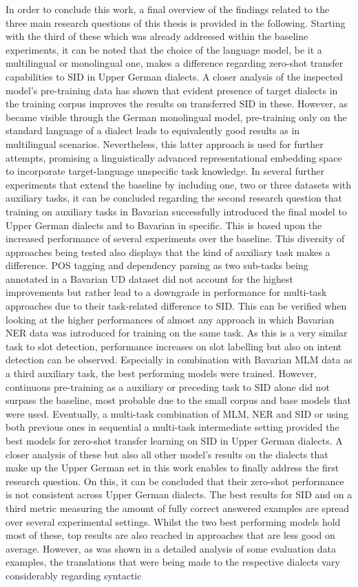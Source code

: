\documentclass[11pt,a4paper,twoside,openright]{scrbook}
\begin{document}
In order to conclude this work, a final overview of the findings related to the three main research questions of this thesis is provided in the following. Starting with the third of these which was already addressed within the baseline experiments, it can be noted that the choice of the language model, be it a multilingual or monolingual one, makes a difference regarding zero-shot transfer capabilities to SID in Upper German dialects. A closer analysis of the inspected model's pre-training data has shown that evident presence of target dialects in the training corpus improves the results on transferred SID in these. However, as became visible through the German monolingual model, pre-training only on the standard language of a dialect leads to equivalently good results as in multilingual scenarios. Nevertheless, this latter approach is used for further attempts, promising a linguistically advanced representational embedding space to incorporate target-language unspecific task knowledge. In several further experiments that extend the baseline by including one, two or three datasets with auxiliary tasks, it can be concluded regarding the second research question that training on auxiliary tasks in Bavarian successfully introduced the final model to Upper German dialects and to Bavarian in specific. This is based upon the increased performance of several experiments over the baseline. This diversity of approaches being tested also displays that the kind of auxiliary task makes a difference. POS tagging and dependency parsing as two sub-tasks being annotated in a Bavarian UD dataset did not account for the highest improvements but rather lead to a downgrade in performance for multi-task approaches due to their task-related difference to SID. This can be verified when looking at the higher performances of almost any approach in which Bavarian NER data was introduced for training on the same task. As this is a very similar task to slot detection, performance increases on slot labelling but also on intent detection can be observed. Especially in combination with Bavarian MLM data as a third auxiliary task, the best performing models were trained. However, continuous pre-training as a auxiliary or preceding task to SID alone did not surpass the baseline, most probable due to the small corpus and base models that were used. Eventually, a multi-task combination of MLM, NER and SID or using both previous ones in sequential a multi-task intermediate setting provided the best models for zero-shot transfer learning on SID in Upper German dialects. A closer analysis of these but also all other model's results on the dialects that make up the Upper German set in this work enables to finally address the first research question. On this, it can be concluded that their zero-shot performance is not consistent across Upper German dialects. The best results for SID and on a third metric measuring the amount of fully correct answered examples are spread over several experimental settings. Whilst the two best performing models hold most of these, top results are also reached in approaches that are less good on average. However, as was shown in a detailed analysis of some evaluation data examples, the translations that were being made to the respective dialects vary considerably regarding syntactic 
\end{document}
